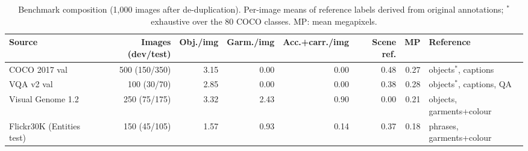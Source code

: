 \begin{table}[!t]
\centering
\scriptsize
\caption{Benchmark composition (1,000 images after de-duplication). Per-image means of reference labels derived from original annotations; $^*$exhaustive over the 80 COCO classes. MP: mean megapixels.}
\label{tab:data}
\begin{adjustbox}{max width=\textwidth}
\begin{tabular}{lrrrrrrl}
\toprule
Source & Images (dev/test) & Obj./img & Garm./img & Acc.+carr./img & Scene ref. & MP & Reference \\
\midrule
COCO 2017 val & 500 (150/350) & 3.15 & 0.00 & 0.00 & 0.48 & 0.27 & objects$^*$, captions \\
VQA v2 val & 100 (30/70) & 2.85 & 0.00 & 0.00 & 0.38 & 0.28 & objects$^*$, captions, QA \\
Visual Genome 1.2 & 250 (75/175) & 3.32 & 2.43 & 0.90 & 0.00 & 0.21 & objects, garments+colour \\
Flickr30K (Entities test) & 150 (45/105) & 1.57 & 0.93 & 0.14 & 0.37 & 0.18 & phrases, garments+colour \\
\bottomrule
\end{tabular}
\end{adjustbox}
\end{table}
